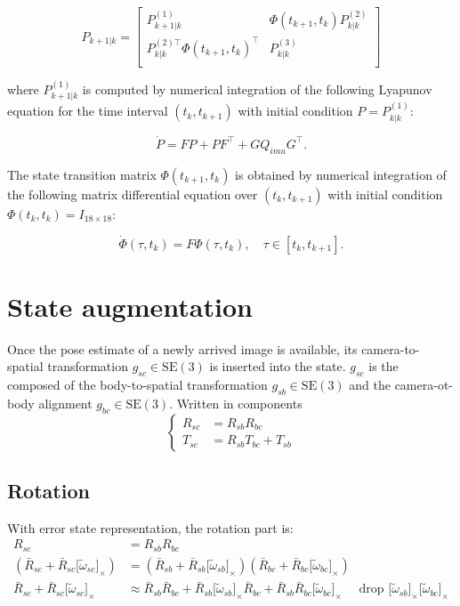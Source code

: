 \documentclass[letter,10pt]{article}
\newcommand{\SE}[1]{ \mathrm{SE(#1)} }
\newcommand{\asym}[1]{{\lbrack #1\rbrack}_\times{}}
\begin{document}
\begin{equation}
    P_{k+1|k} =
    \begin{bmatrix}
        P_{k+1|k}^{(1)} & \Phi(t_{k + 1}, t_k) P_{k|k}^{(2)} \\
        P_{k|k}^{(2)\top}\Phi(t_{k + 1}, t_k)^\top & P_{k|k}^{(3)}  \\
    \end{bmatrix}
    \label{eq:covariance-propagation}
\end{equation}

where $P_{k+1|k}^{(1)}$ is computed by numerical integration of the following Lyapunov equation for the time interval $(t_k, t_{k+1})$ with initial condition $P=P_{k|k}^{(1)}$:

\begin{equation}
    \dot{P} = F P + P F^\top + G Q_{imu} G^\top.
\label{eq:lyapunov}
\end{equation}

The state transition matrix $\Phi(t_{k+1}, t_k)$ is obtained by numerical integration of the following matrix differential equation over $(t_k, t_{k+1})$ with initial condition $\Phi(t_k, t_k)=I_{18\times 18}$:

\begin{equation}
    \dot{\Phi}(\tau, t_k) = F \Phi(\tau, t_k), \quad\tau \in [t_k, t_{k+1}].
\end{equation}

\section{State augmentation}
Once the pose estimate of a newly arrived image is available, its camera-to-spatial transformation $g_{sc} \in \SE{3}$ is inserted into the state. $g_{sc}$ is the composed of the body-to-spatial transformation $g_{sb} \in \SE{3}$ and the camera-ot-body alignment $g_{bc} \in \SE{3}$. Written in components
\begin{equation}
\begin{cases}
R_{sc} &= R_{sb} R_{bc}\\
T_{sc} &= R_{sb} T_{bc} + T_{sb}
\end{cases}
\end{equation}

\subsection{Rotation}
With error state representation, the rotation part is:
\begin{equation}
 \begin{aligned}
R_{sc} &= R_{sb} R_{bc} \\
 (\bar R_{sc} + \bar R_{sc} \asym{\tilde\omega_{sc}}) &= 
 (\bar R_{sb} + \bar R_{sb} \asym{\tilde\omega_{sb}}) (\bar R_{bc} + \bar R_{bc} \asym{\tilde\omega_{bc}}) \\
 \bar R_{sc} + \bar R_{sc}\asym{\tilde \omega_{sc}} &\approx \bar R_{sb} \bar R_{bc} 
 + \bar R_{sb} \asym{\tilde \omega_{sb}} \bar R_{bc} + \bar R_{sb} \bar R_{bc} \asym{\tilde\omega_{bc}} \quad \text{ drop } \asym{\tilde\omega_{sb}}\asym{\tilde\omega_{bc}}
 \end{aligned}
\end{equation}
\end{document}
